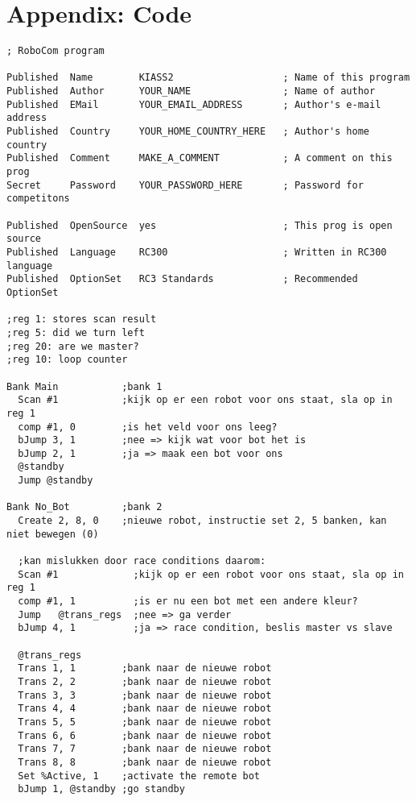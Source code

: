 \documentclass[10pt]{article}
\begin{document}



\pagebreak
\section*{Appendix: Code}

\smallskip

\begin{verbatim}; RoboCom program

Published  Name        KIASS2                   ; Name of this program
Published  Author      YOUR_NAME                ; Name of author
Published  EMail       YOUR_EMAIL_ADDRESS       ; Author's e-mail address
Published  Country     YOUR_HOME_COUNTRY_HERE   ; Author's home country
Published  Comment     MAKE_A_COMMENT           ; A comment on this prog
Secret     Password    YOUR_PASSWORD_HERE       ; Password for competitons

Published  OpenSource  yes                      ; This prog is open source
Published  Language    RC300                    ; Written in RC300 language
Published  OptionSet   RC3 Standards            ; Recommended OptionSet

;reg 1: stores scan result
;reg 5: did we turn left
;reg 20: are we master?
;reg 10: loop counter

Bank Main           ;bank 1
  Scan #1           ;kijk op er een robot voor ons staat, sla op in reg 1
  comp #1, 0        ;is het veld voor ons leeg?
  bJump 3, 1        ;nee => kijk wat voor bot het is
  bJump 2, 1        ;ja => maak een bot voor ons
  @standby
  Jump @standby
  
Bank No_Bot         ;bank 2
  Create 2, 8, 0    ;nieuwe robot, instructie set 2, 5 banken, kan niet bewegen (0) 
  
  ;kan mislukken door race conditions daarom:
  Scan #1             ;kijk op er een robot voor ons staat, sla op in reg 1
  comp #1, 1          ;is er nu een bot met een andere kleur?  
  Jump   @trans_regs  ;nee => ga verder
  bJump 4, 1          ;ja => race condition, beslis master vs slave
  
  @trans_regs
  Trans 1, 1        ;bank naar de nieuwe robot
  Trans 2, 2        ;bank naar de nieuwe robot
  Trans 3, 3        ;bank naar de nieuwe robot
  Trans 4, 4        ;bank naar de nieuwe robot
  Trans 5, 5        ;bank naar de nieuwe robot
  Trans 6, 6        ;bank naar de nieuwe robot
  Trans 7, 7        ;bank naar de nieuwe robot
  Trans 8, 8        ;bank naar de nieuwe robot
  Set %Active, 1    ;activate the remote bot
  bJump 1, @standby ;go standby
  

\end{verbatim}
\end{document}
